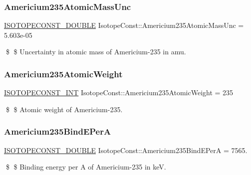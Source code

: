 \subsubsection{\texorpdfstring{Americium235\+Atomic\+Mass\+Unc}{Americium235AtomicMassUnc}}
{\footnotesize\ttfamily \mbox{\hyperlink{group___isotope_const-_macros_ga8f45a7272ce02c0b4c65c44636ed719a}{I\+S\+O\+T\+O\+P\+E\+C\+O\+N\+S\+T\+\_\+\+D\+O\+U\+B\+LE}} Isotope\+Const\+::\+Americium235\+Atomic\+Mass\+Unc = 5.\+603e-\/05}

\$ \$ Uncertainty in atomic mass of Americium-\/235 in amu. \mbox{\label{group___isotope_const-_americium-_am235_gaae3c84b3e26f15484d1e37fac255385b}} 
\subsubsection{\texorpdfstring{Americium235\+Atomic\+Weight}{Americium235AtomicWeight}}
{\footnotesize\ttfamily \mbox{\hyperlink{group___isotope_const-_macros_ga5f18360b3e99483a35c32d789e62621c}{I\+S\+O\+T\+O\+P\+E\+C\+O\+N\+S\+T\+\_\+\+I\+NT}} Isotope\+Const\+::\+Americium235\+Atomic\+Weight = 235}

\$ \$ Atomic weight of Americium-\/235. \mbox{\label{group___isotope_const-_americium-_am235_gafeb59d73baf6a5ed4b99f8cb61148392}} 
\subsubsection{\texorpdfstring{Americium235\+Bind\+E\+PerA}{Americium235BindEPerA}}
{\footnotesize\ttfamily \mbox{\hyperlink{group___isotope_const-_macros_ga8f45a7272ce02c0b4c65c44636ed719a}{I\+S\+O\+T\+O\+P\+E\+C\+O\+N\+S\+T\+\_\+\+D\+O\+U\+B\+LE}} Isotope\+Const\+::\+Americium235\+Bind\+E\+PerA = 7565.}

\$ \$ Binding energy per A of Americium-\/235 in keV. \mbox{\label{group___isotope_const-_americium-_am235_gaa2ef723dadcf880a6323a740ae9abc7f}} 
